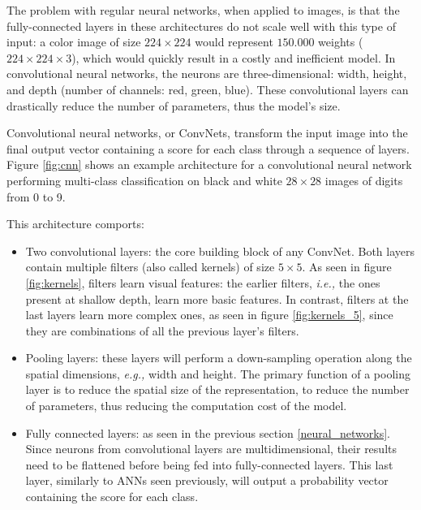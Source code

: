 The problem with regular neural networks, when applied to images, is that the
fully-connected layers in these architectures do not scale well with this type
of input: a color image of size $224 \times 224$ would represent $150.000$
weights ($224 \times 224 \times 3$), which would quickly result in a costly and
inefficient model. In convolutional neural networks, the neurons are
three-dimensional: width, height, and depth (number of channels: red, green,
blue). These convolutional layers can drastically reduce the number of
parameters, thus the model's size.


Convolutional neural networks, or ConvNets, transform the input image into the
final output vector containing a score for each class through a sequence of
layers. Figure \ref{fig:cnn} shows an example architecture for a convolutional
neural network performing multi-class classification on black and white $28
    \times 28$ images of digits from 0 to 9.

This architecture comports:
\begin{itemize}
    \item Two convolutional layers: the core building block of any ConvNet. Both
          layers contain multiple filters (also called kernels) of size $5
              \times 5$. As seen in figure \ref{fig:kernels}, filters learn visual
          features: the earlier filters, \emph{i.e.,} the ones present at
          shallow depth, learn more basic features. In contrast, filters at the
          last layers learn more complex ones, as seen in figure
          \ref{fig:kernels_5}, since they are combinations of all the previous
          layer's filters.
    \item Pooling layers: these layers will perform a down-sampling operation
          along the spatial dimensions, \emph{e.g.,} width and height. The
          primary function of a pooling layer is to reduce the spatial size of
          the representation, to reduce the number of parameters, thus reducing
          the computation cost of the model.
    \item Fully connected layers: as seen in the previous section
          \ref{neural_networks}. Since neurons from convolutional layers are
          multidimensional, their results need to be flattened before being fed
          into fully-connected layers. This last layer, similarly to ANNs seen
          previously, will output a probability vector containing the score for
          each class.
\end{itemize}

